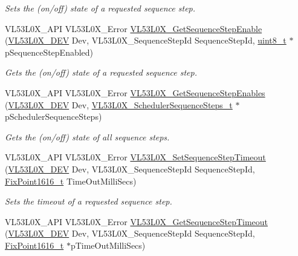\begin{DoxyCompactItemize}
\begin{DoxyCompactList}\small\item\em Sets the (on/off) state of a requested sequence step. \end{DoxyCompactList}\item 
V\+L53\+L0\+X\+\_\+\+A\+PI V\+L53\+L0\+X\+\_\+\+Error \hyperlink{group__VL53L0X__parameters__group_ga27047120f1ee506c3ddf07baed683b81}{V\+L53\+L0\+X\+\_\+\+Get\+Sequence\+Step\+Enable} (\hyperlink{group__VL53L0X__platform__group_ga2d6405308b1dd524b462f1b8fb97d167}{V\+L53\+L0\+X\+\_\+\+D\+EV} Dev, V\+L53\+L0\+X\+\_\+\+Sequence\+Step\+Id Sequence\+Step\+Id, \hyperlink{vl53l0x__types_8h_aba7bc1797add20fe3efdf37ced1182c5}{uint8\+\_\+t} $\ast$p\+Sequence\+Step\+Enabled)
\begin{DoxyCompactList}\small\item\em Gets the (on/off) state of a requested sequence step. \end{DoxyCompactList}\item 
V\+L53\+L0\+X\+\_\+\+A\+PI V\+L53\+L0\+X\+\_\+\+Error \hyperlink{group__VL53L0X__parameters__group_ga7fc642dea262d2853ac0e9f4bf7d9024}{V\+L53\+L0\+X\+\_\+\+Get\+Sequence\+Step\+Enables} (\hyperlink{group__VL53L0X__platform__group_ga2d6405308b1dd524b462f1b8fb97d167}{V\+L53\+L0\+X\+\_\+\+D\+EV} Dev, \hyperlink{structVL53L0X__SchedulerSequenceSteps__t}{V\+L53\+L0\+X\+\_\+\+Scheduler\+Sequence\+Steps\+\_\+t} $\ast$p\+Scheduler\+Sequence\+Steps)
\begin{DoxyCompactList}\small\item\em Gets the (on/off) state of all sequence steps. \end{DoxyCompactList}\item 
V\+L53\+L0\+X\+\_\+\+A\+PI V\+L53\+L0\+X\+\_\+\+Error \hyperlink{group__VL53L0X__parameters__group_ga14baa118af01991f4633f0090b437170}{V\+L53\+L0\+X\+\_\+\+Set\+Sequence\+Step\+Timeout} (\hyperlink{group__VL53L0X__platform__group_ga2d6405308b1dd524b462f1b8fb97d167}{V\+L53\+L0\+X\+\_\+\+D\+EV} Dev, V\+L53\+L0\+X\+\_\+\+Sequence\+Step\+Id Sequence\+Step\+Id, \hyperlink{vl53l0x__types_8h_afb910790161809fc76e1a274a6349384}{Fix\+Point1616\+\_\+t} Time\+Out\+Milli\+Secs)
\begin{DoxyCompactList}\small\item\em Sets the timeout of a requested sequence step. \end{DoxyCompactList}\item 
V\+L53\+L0\+X\+\_\+\+A\+PI V\+L53\+L0\+X\+\_\+\+Error \hyperlink{group__VL53L0X__parameters__group_gacac67612ceb128355f2bc7a4354a049f}{V\+L53\+L0\+X\+\_\+\+Get\+Sequence\+Step\+Timeout} (\hyperlink{group__VL53L0X__platform__group_ga2d6405308b1dd524b462f1b8fb97d167}{V\+L53\+L0\+X\+\_\+\+D\+EV} Dev, V\+L53\+L0\+X\+\_\+\+Sequence\+Step\+Id Sequence\+Step\+Id, \hyperlink{vl53l0x__types_8h_afb910790161809fc76e1a274a6349384}{Fix\+Point1616\+\_\+t} $\ast$p\+Time\+Out\+Milli\+Secs)

\end{DoxyCompactItemize}

